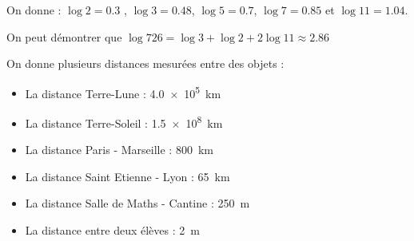 \documentclass[12pt,a4paper,oneside,dvipsnames,table,svgnames,skins,theorems]{report}
\begin{document}
On donne : $\log 2 = 0.3$ , $\log 3 = 0.48$, $\log 5 =0.7$, $\log 7 = 0.85$ et $\log 11 = 1.04$.
\begin{correction}
On peut démontrer que $\log 726 = \log 3 + \log 2 + 2\log 11 \approx 2.86$
\end{correction}

\finexo
\vspace{0.1cm}

\exo{} On donne plusieurs distances mesurées entre des objets :
\begin{itemize}
\item La distance Terre-Lune : \SI{4.0e5}{\kilo\meter}
\item La distance Terre-Soleil : \SI{1.5e8}{\kilo\meter}
\item La distance Paris - Marseille : \SI{800}{\kilo\meter}
\item La distance Saint Etienne - Lyon : \SI{65}{\kilo\meter}
\item La distance Salle de Maths - Cantine : \SI{250}{\meter}
\item La distance entre deux élèves : \SI{2}{\meter}
\end{itemize}
\vspace{0.2cm}
\end{document}
